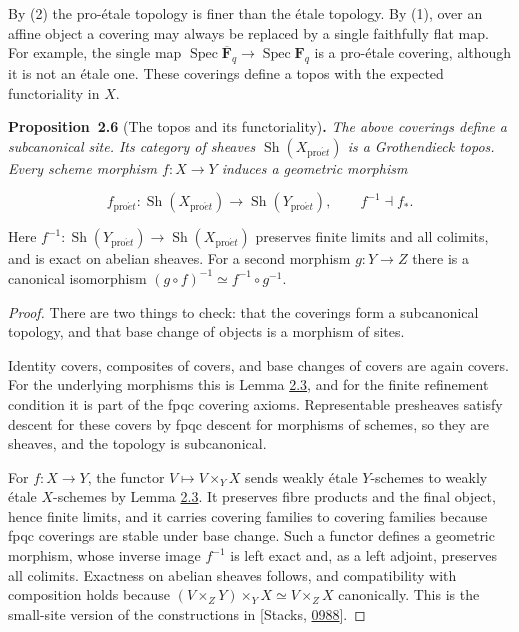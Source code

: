 \documentclass[11pt]{article}
\newenvironment{bpstatement}[2]{\par\addvspace{0.6\baselineskip}\noindent\textbf{#1}#2\textbf{.}\enspace\ignorespaces}
  {\par\addvspace{0.4\baselineskip}}
\newenvironment{bpstatementit}[2]{\begin{bpstatement}{#1}{#2}\itshape\ignorespaces}{\end{bpstatement}}
\providecommand{\Sh}{}\renewcommand{\Sh}{\operatorname{Sh}}
\begin{document}
\label{bp16}%
By (2) the pro-étale topology is finer than the étale topology. By (1), over an affine object a covering may always be replaced by a single faithfully flat map. For example, the single map \(\operatorname{Spec}\overline{\mathbf F}_q\to\operatorname{Spec}\mathbf F_q\) is a pro-étale covering, although it is not an étale one. These coverings define a topos with the expected functoriality in \(X\).

\label{bp17}%
\begin{bpstatementit}{Proposition~2.6}{ (The topos and its functoriality)}
The above coverings define a subcanonical site. Its category of sheaves \(\Sh(X_{\mathrm{pro}\acute{e}t})\) is a Grothendieck topos. Every scheme morphism \(f:X\to Y\) induces a geometric morphism

\[
f_{\mathrm{pro}\acute{e}t}:\Sh(X_{\mathrm{pro}\acute{e}t})\longrightarrow\Sh(Y_{\mathrm{pro}\acute{e}t}),
\qquad f^{-1}\dashv f_*.
\]

Here \(f^{-1}:\Sh(Y_{\mathrm{pro}\acute{e}t})\to\Sh(X_{\mathrm{pro}\acute{e}t})\) preserves finite limits and all colimits, and is exact on abelian sheaves. For a second morphism \(g:Y\to Z\) there is a canonical isomorphism \((g\circ f)^{-1}\simeq f^{-1}\circ g^{-1}\).
\end{bpstatementit}

\begin{proof}[{Proof}]\label{bp18}%
There are two things to check: that the coverings form a subcanonical topology, and that base change of objects is a morphism of sites.

Identity covers, composites of covers, and base changes of covers are again covers. For the underlying morphisms this is Lemma \hyperref[bp10]{2.3}, and for the finite refinement condition it is part of the fpqc covering axioms. Representable presheaves satisfy descent for these covers by fpqc descent for morphisms of schemes, so they are sheaves, and the topology is subcanonical.

For \(f:X\to Y\), the functor \(V\mapsto V\times_YX\) sends weakly étale \(Y\)-schemes to weakly étale \(X\)-schemes by Lemma \hyperref[bp10]{2.3}. It preserves fibre products and the final object, hence finite limits, and it carries covering families to covering families because fpqc coverings are stable under base change. Such a functor defines a geometric morphism, whose inverse image \(f^{-1}\) is left exact and, as a left adjoint, preserves all colimits. Exactness on abelian sheaves follows, and compatibility with composition holds because \((V\times_ZY)\times_YX\simeq V\times_ZX\) canonically. This is the small-site version of the constructions in [Stacks, \href{https://stacks.math.columbia.edu/tag/0988}{0988}].
\end{proof}
\end{document}
